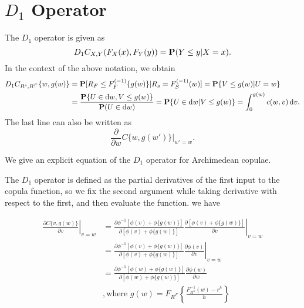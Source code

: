 
\section{$D_1$ Operator}

The $D_1$ operator is given as
\begin{equation*}
    D_1 C_{X,Y}(F_X(x), F_Y(y)) = {\bf P}(Y\leq y|X=x).
\end{equation*}
In the context of the above notation, we obtain
\begin{align*}
  D_1 C_{R^s, R^F}\{w, g(w)\} &= \p[R_F\leq F_{F}^{(-1)}\{g(w)\}|
  R_s=F_S^{(-1)}(w)] %
  = \p\{V\leq g(w)| U=w\}\\ %
  &= \frac{\p\{U\in \dd w, V\leq g(w)\}} {\p(U\in \dd w)} %
  = \p\{U\in \dd w| V\leq g(w)\} %
  = \int_0^{g(w)} c(w,v)\, \dd v. 
\end{align*}
The last line can also be written as
\begin{equation*}
  \frac{\partial }{\partial w} C\{w, g(w')\} \big|_{w'=w}.
\end{equation*}



We give an explicit equation of the $D_1$ operator for Archimedean copulae.

The $D_1$ operator is defined as the partial derivatives of the first input to the copula function,
so we fix the second argument while taking derivative with respect to the first, and then evaluate the function.
we have

\begin{align}
\left.\frac{\partial C\{v, g(w)\}}{\partial v} \right\vert_{v=w}
&=
\left.\frac{\partial  \phi^{-1}[\phi(v)+\phi\{g(w)\}]}
{\partial  [\phi(v)+\phi\{g(w)\}]}
\frac{\partial  [\phi(v)+\phi\{g(w)\}]}
{\partial  v}
\right\vert_{v=w}\\
&=
\left.\frac{\partial   \phi^{-1}[\phi(v)+\phi\{g(w)\}]}
{\partial [\phi(v)+\phi\{g(w)\}]}
\frac{\partial  \phi(v)}{\partial  v}
\right\vert_{v=w}\\
&=
\frac{\partial \phi^{-1}[\phi(w)+\phi\{g(w)\}]}
{\partial [\phi(w)+\phi\{g(w)\}]}
\frac{\partial  \phi(w)}{\partial  w}\\
&,
\text{where } g(w) = F_{R^F}\left\{\frac{F^{-1}_{R^S}(w)-r^h}{h}\right\}\\
\end{align}

